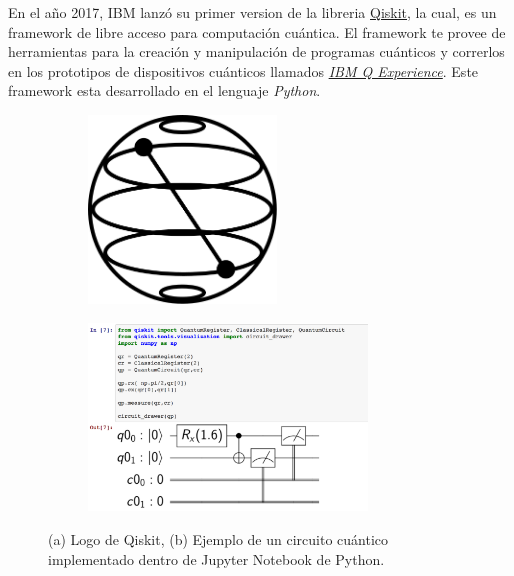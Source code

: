 En el año 2017, IBM lanzó su primer version de la libreria \href{https://qiskit.org/}{Qiskit}, la cual, es un framework de libre acceso para computación cuántica. El framework te provee de herramientas para la creación y manipulación de programas cuánticos
y correrlos en los prototipos de dispositivos cuánticos llamados \href{https://quantum-computing.ibm.com/}{\textit{IBM Q Experience}}. Este framework esta desarrollado en el lenguaje \textit{Python}. 
\begin{figure}[H]
    \begin{subfigure}{0.5\textwidth}
        \centering
        \caption{}
    \includegraphics[height=5cm]{images/Qiskit.png}
    \label{fig:logo_qiskit}
    \end{subfigure}
    \begin{subfigure}{0.5\textwidth}
        \centering
        \caption{}
    \includegraphics[height=5cm]{images/Example_qiskit.png}
    \label{fig:example_qiskit}
    \end{subfigure}
    \caption{(a) Logo de Qiskit, (b) Ejemplo de un circuito cuántico implementado dentro de Jupyter Notebook de Python.}
\end{figure}